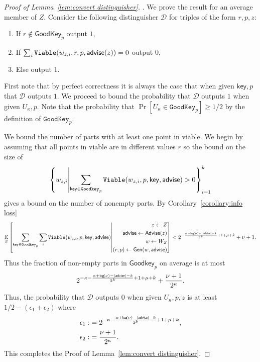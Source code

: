 \begin{proof}[Proof of Lemma~\ref{lem:convert distinguisher}].
We prove the result for an average member of $Z$.
Consider the following distinguisher $\mathcal{D}$ for triples of the form $r, p, z$:
\begin{enumerate}
\item If $r \not\in \mathsf{GoodKey}_p$ output $1$,
\item If $\sum_{i} \mathtt{Viable}(w_{z, i}, r, p, {\mathsf{advise}}(z)) =0 $ output $0$,
\item Else output $1$.
\end{enumerate}
First note that by perfect correctness it is always the case that when given $\mathsf{key}, p$ that $\mathcal{D}$ outputs $1$.  We proceed to bound the probability that $\mathcal{D}$ outputs $1$ when given $U_\kappa, p$.  Note that the probability that $\Pr[U_\kappa \in \mathtt{GoodKey}_p] \ge 1/2$ by the definition of $\mathtt{GoodKey}_p$. 

We bound the number of parts with at least one point in viable.  We begin by assuming that all points in viable are in different  values $r$ so the bound on the size of 
\[
\left\{w_{z, i} \middle|\sum_{\mathsf{key}\in\mathtt{Goodkey}_p} \mathtt{Viable}(w_{z,i}, p, \mathsf{key}, {\mathsf{advise}})>0\right\}_{i=1}^k 
\] 
gives a bound on the number of nonempty parts. By Corollary~\ref{corollary:info loss} 
\[
\operatorname*{\mathbb{E}}_{Z} \left[\sum_{\mathsf{key} \in \mathtt{Goodkey}_p}\sum_{i }  \mathtt{Viable}(w_{z,i}, p, \mathsf{key}, {\mathsf{advise}}) \middle| \begin{aligned} z\leftarrow Z\\ {\mathsf{advise}}\leftarrow {\ensuremath{\mathsf{Advise}}}(z)\\w\leftarrow W_Z\\(r, p)\leftarrow {\ensuremath{\mathsf{Gen}}}(w, {\mathsf{advise}})\end{aligned} \right]< 2^{-\frac{\alpha+\mathsf{log}\!\left(\nu\right)-|{\mathsf{advise}}|-k}{2^k}+1+\mu+k}+\nu+1.
\]
Thus the fraction of non-empty parts in $\mathsf{Goodkey}_p$ on average is at most 
\[
2^{-\kappa-\frac{\alpha+\mathsf{log}\!\left(\nu\right)-|{\mathsf{advise}}|-k}{2^k}+1+\mu+k}+\frac{\nu+1}{2^\kappa}.
\]
Thus, the probability that $\mathcal{D}$ outputs $0$ when given $U_\kappa, p, z$ is at least 
$1/2-(\epsilon_1+\epsilon_2)$
where 
\begin{align*}
\epsilon_1:&=2^{-\kappa-\frac{\alpha+\mathsf{log}\!\left(\nu\right)-|{\mathsf{advise}}|-k}{2^k}+1+\mu+k},\\
\epsilon_2:&=\frac{\nu+1}{2^{\kappa}}.
\end{align*}
\noindent
This completes the Proof of Lemma~\ref{lem:convert distinguisher}.
\end{proof}


